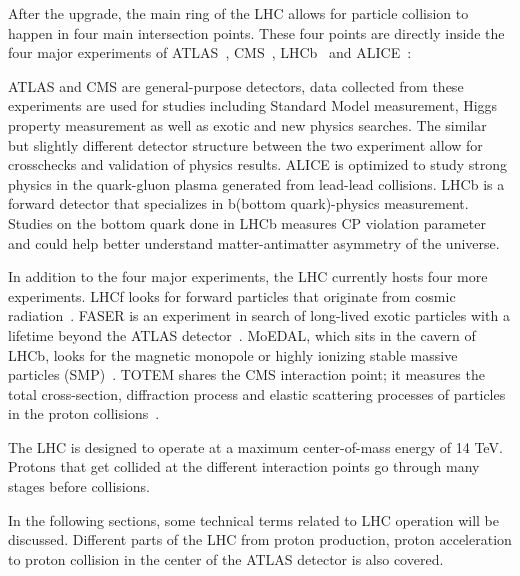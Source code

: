 After the upgrade, the main ring of the LHC allows for particle collision to happen in four main intersection points. These four points are directly inside the four major experiments of ATLAS~\cite{ATLAS:1999vwa}, CMS~\cite{CMS:2006myw}, LHCb~\cite{lhcb2001technical} and ALICE~\cite{Cortese:519145}: 

ATLAS and CMS are general-purpose detectors, data collected from these experiments are used for studies including Standard Model measurement, Higgs property measurement as well as exotic and new physics searches. The similar but slightly different detector structure between the two experiment allow for crosschecks and validation of physics results. ALICE is optimized to study strong physics in the quark-gluon plasma generated from lead-lead collisions. LHCb is a forward detector that specializes in b(bottom quark)-physics measurement. Studies on the bottom quark done in LHCb measures CP violation parameter and could help better understand matter-antimatter asymmetry of the universe. 

In addition to the four major experiments, the LHC currently hosts four more experiments. LHCf looks for forward particles that originate from cosmic radiation~\cite{Adriani:926196}. FASER is an experiment in search of long-lived exotic particles with a lifetime beyond the ATLAS detector~\cite{Ariga:2651328}. MoEDAL, which sits in the cavern of LHCb, looks for the magnetic monopole or highly ionizing stable massive particles (SMP)~\cite{Pinfold:1181486}. TOTEM shares the CMS interaction point; it measures the total
cross-section, diffraction process and elastic scattering processes of particles in the proton collisions~\cite{TOTEM:2004hps}. 

The LHC is designed to operate at a maximum center-of-mass energy of 14 TeV. Protons that get collided at the different interaction points go through many stages before collisions. 

In the following sections, some technical terms related to LHC operation will be discussed. Different parts of the LHC from proton production, proton acceleration to proton collision in the center of the ATLAS detector is also covered.

